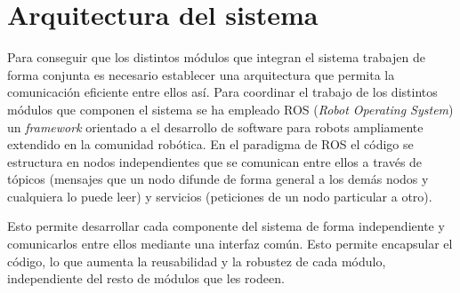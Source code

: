 \chapter{Arquitectura del sistema}
\label{cap:arquitectura}
Para conseguir que los distintos módulos que integran el sistema trabajen de forma conjunta es necesario establecer una arquitectura que permita la comunicación eficiente entre ellos así. Para coordinar el trabajo de los distintos módulos que componen el sistema se ha empleado ROS (\textit{Robot Operating System}) \cite{ros} un \textit{framework} orientado a el desarrollo de software para robots ampliamente extendido en la comunidad robótica. En el paradigma de ROS el código se estructura en nodos independientes que se comunican entre ellos a través de tópicos (mensajes que un nodo difunde de forma general a los demás nodos y cualquiera lo puede leer) y servicios (peticiones de un nodo particular a otro).

Esto permite desarrollar cada componente del sistema de forma independiente y comunicarlos entre ellos mediante una interfaz común. Esto permite encapsular el código, lo que aumenta la reusabilidad y la robustez de cada módulo, independiente del resto de módulos que les rodeen.

